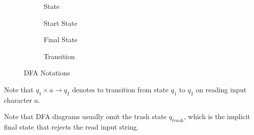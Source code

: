 \begin{definition}
    \begin{figure}[H]
        \centering
        \begin{subfigure}{0.24\textwidth}
            \centering
            \caption{State}
        \end{subfigure}
        \begin{subfigure}{0.24\textwidth}
            \centering
            \caption{Start State}
        \end{subfigure}
        \begin{subfigure}{0.24\textwidth}
            \centering
            \caption{Final State}
        \end{subfigure}
        \begin{subfigure}{0.24\textwidth}
            \centering
            \caption{Transition}
        \end{subfigure}
        \caption{DFA Notations}
        \label{fig:dfa-notations}
    \end{figure}
    
    Note that $q_1 \times a \to q_2$ denotes to transition from state $q_1$ to $q_2$ on reading input character $a$.
\end{definition}

\begin{remark}
    Note that DFA diagrams usually omit the trash state $q_{\textit{trash}}$, which is the implicit final state that rejects the read input string.
\end{remark}
